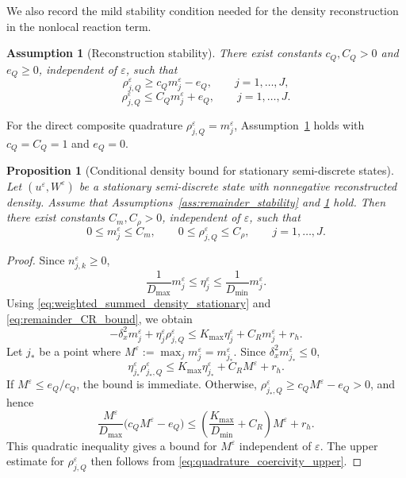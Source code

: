 \documentclass[11pt]{article}
\newtheorem{proposition}{Proposition}[section]
\newtheorem{assumption}{Assumption}[section]
\begin{document}
We also record the mild stability condition needed for the density
reconstruction in the nonlocal reaction term.

\begin{assumption}[Reconstruction stability]
\label{ass:reconstruction_stability}
There exist constants \(c_Q,C_Q>0\) and \(e_Q\ge0\), independent of
\(\varepsilon\), such that
\begin{equation}\label{eq:quadrature_coercivity_lower}
    \rho_{j,Q}^\varepsilon
    \ge
    c_Qm_j^\varepsilon-e_Q,
    \qquad j=1,\ldots,J,
\end{equation}
\begin{equation}\label{eq:quadrature_coercivity_upper}
    \rho_{j,Q}^\varepsilon
    \le
    C_Qm_j^\varepsilon+e_Q,
    \qquad j=1,\ldots,J .
\end{equation}
\end{assumption}
For the direct composite quadrature \(\rho_{j,Q}^\varepsilon=m_j^\varepsilon\),
Assumption~\ref{ass:reconstruction_stability} holds with
\(c_Q=C_Q=1\) and \(e_Q=0\).

\begin{proposition}[Conditional density bound for stationary semi-discrete states]
\label{prop:uniform_bound_stationary_mass}
Let \((u^\varepsilon,W^\varepsilon)\) be a stationary semi-discrete state with
nonnegative reconstructed density. Assume that
Assumptions~\ref{ass:remainder_stability} and
\ref{ass:reconstruction_stability} hold. Then there exist constants
\(C_m,C_\rho>0\), independent of \(\varepsilon\), such that
\[
    0\le m_j^\varepsilon\le C_m,
    \qquad
    0\le \rho_{j,Q}^\varepsilon\le C_\rho,
    \qquad j=1,\ldots,J .
\]
\end{proposition}

\begin{proof}
Since \(n_{j,k}^\varepsilon\ge0\),
\[
    \frac1{D_{\max}}m_j^\varepsilon
    \le
    \eta_j^\varepsilon
    \le
    \frac1{D_{\min}}m_j^\varepsilon .
\]
Using \eqref{eq:weighted_summed_density_stationary} and
\eqref{eq:remainder_CR_bound}, we obtain
\[
    -\delta_x^2m_j^\varepsilon
    +
    \eta_j^\varepsilon\rho_{j,Q}^\varepsilon
    \le
    K_{\max}\eta_j^\varepsilon
    +
    C_Rm_j^\varepsilon
    +
    r_h .
\]
Let \(j_*\) be a point where
\(M^\varepsilon:=\max_jm_j^\varepsilon=m_{j_*}^\varepsilon\). Since
\(\delta_x^2m_{j_*}^\varepsilon\le0\),
\[
    \eta_{j_*}^\varepsilon\rho_{j_*,Q}^\varepsilon
    \le
    K_{\max}\eta_{j_*}^\varepsilon
    +
    C_RM^\varepsilon+r_h .
\]
If \(M^\varepsilon\le e_Q/c_Q\), the bound is immediate. Otherwise,
\(\rho_{j_*,Q}^\varepsilon\ge c_QM^\varepsilon-e_Q>0\), and hence
\[
    \frac{M^\varepsilon}{D_{\max}}
    \bigl(c_QM^\varepsilon-e_Q\bigr)
    \le
    \left(\frac{K_{\max}}{D_{\min}}+C_R\right)M^\varepsilon+r_h .
\]
This quadratic inequality gives a bound for \(M^\varepsilon\) independent of
\(\varepsilon\). The upper estimate for \(\rho_{j,Q}^\varepsilon\) then follows
from \eqref{eq:quadrature_coercivity_upper}.
\end{proof}
\end{document}
